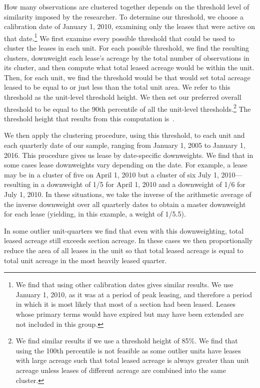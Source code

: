\documentclass[12pt]{article}
\begin{document}
How many observations are clustered together depends on the threshold level of similarity imposed by the researcher. To determine our threshold, we choose a calibration date of January 1, 2010, examining only the leases that were active on that date.\footnote{We find that using other calibration dates gives similar results. We use January 1, 2010, as it was at a period of peak leasing, and therefore a period in which it is most likely that most of a section had been leased. Leases whose primary terms would have expired but may have been extended are not included in this group.} We first examine every possible threshold that could be used to cluster the leases in each unit. For each possible threshold, we find the resulting clusters, downweight each lease's acreage by the total number of observations in its cluster, and then compute what total leased acreage would be within the unit. Then, for each unit, we find the threshold would be that would set total acreage leased to be equal to or just less than the total unit area. We refer to this threshold as the unit-level threshold height. We then set our preferred overall threshold to be equal to the 90th percentile of all the unit-level thresholds.\footnote{We find similar results if we use a threshold height of 85\%. We find that using the 100th percentile is not feasible as some outlier units have leases with large acreage such that total leased acreage is always greater than unit acreage unless leases of different acreage are combined into the same cluster.} The threshold height that results from this computation is~\unskip. 

We then apply the clustering procedure, using this threshold, to each unit and each quarterly date of our sample, ranging from January 1, 2005 to January 1, 2016. This procedure gives us lease by date-specific downweights. We find that in some cases lease downweights vary depending on the date. For example, a lease may be in a cluster of five on April 1, 2010 but a cluster of six July 1, 2010---resulting in a downweight of 1/5 for April 1, 2010 and a downweight of 1/6 for July 1, 2010. In these situations, we take the inverse of the arithmetic average of the inverse downweight over all quarterly dates to obtain a master downweight for each lease (yielding, in this example, a weight of 1/5.5).

In some outlier unit-quarters we find that even with this downweighting, total leased acreage still exceeds section acreage. In these cases we then proportionally reduce the area of all leases in the unit so that total leased acreage is equal to total unit acreage in the most heavily leased quarter.
\end{document}
